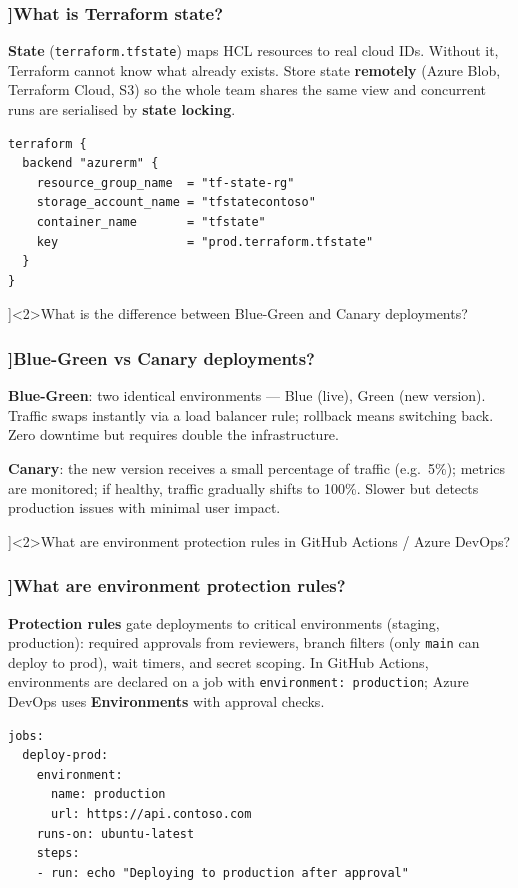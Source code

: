 \begin{frame}[fragile]
  \frametitle{\AnswerTitle[\CategoryBadge[CICDColor!20]{CI/CD \& IaC}]{What is Terraform state?}}

  {\footnotesize
  \textbf{State} (\texttt{terraform.tfstate}) maps HCL resources to real cloud IDs. Without it, Terraform cannot know what already exists. Store state \textbf{remotely} (Azure Blob, Terraform Cloud, S3) so the whole team shares the same view and concurrent runs are serialised by \textbf{state locking}.
  }

  \begin{verbatim}
terraform {
  backend "azurerm" {
    resource_group_name  = "tf-state-rg"
    storage_account_name = "tfstatecontoso"
    container_name       = "tfstate"
    key                  = "prod.terraform.tfstate"
  }
}
  \end{verbatim}
\end{frame}

\QuestionSlide[\CategoryBadge[CICDColor!20]{CI/CD \& IaC}]<2>{What is the difference between Blue-Green and Canary deployments?}

\begin{frame}[fragile]
  \frametitle{\AnswerTitle[\CategoryBadge[CICDColor!20]{CI/CD \& IaC}]{Blue-Green vs Canary deployments?}}

  {\footnotesize
  \textbf{Blue-Green}: two identical environments — Blue (live), Green (new version). Traffic swaps instantly via a load balancer rule; rollback means switching back. Zero downtime but requires double the infrastructure.
  \vspace{0.5em}

  \textbf{Canary}: the new version receives a small percentage of traffic (e.g.\ 5\%); metrics are monitored; if healthy, traffic gradually shifts to 100\%. Slower but detects production issues with minimal user impact.
  }
\end{frame}

\QuestionSlide[\CategoryBadge[CICDColor!20]{CI/CD \& IaC}]<2>{What are environment protection rules in GitHub Actions / Azure DevOps?}

\begin{frame}[fragile]
  \frametitle{\AnswerTitle[\CategoryBadge[CICDColor!20]{CI/CD \& IaC}]{What are environment protection rules?}}

  {\footnotesize
  \textbf{Protection rules} gate deployments to critical environments (staging, production): required approvals from reviewers, branch filters (only \texttt{main} can deploy to prod), wait timers, and secret scoping. In GitHub Actions, environments are declared on a job with \texttt{environment: production}; Azure DevOps uses \textbf{Environments} with approval checks.
  }

  \begin{verbatim}
jobs:
  deploy-prod:
    environment:
      name: production
      url: https://api.contoso.com
    runs-on: ubuntu-latest
    steps:
    - run: echo "Deploying to production after approval"
  \end{verbatim}
\end{frame}

